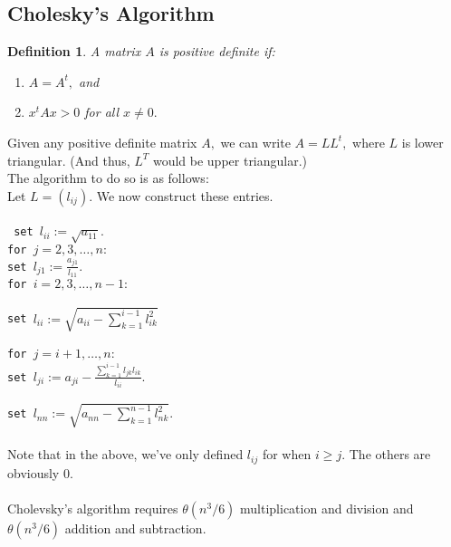 \documentclass{article}
\newtheorem{defn}{Definition}
\begin{document}
\subsection{Cholesky's Algorithm}
\begin{defn} 
	A matrix $A$ is positive definite if:
	\begin{enumerate} 
		\item $A = A^t,$ and
		\item $x^tAx > 0$ for all $x \neq 0.$
	\end{enumerate}
\end{defn}
Given any positive definite matrix $A,$ we can write $A = LL^t,$ where $L$ is lower triangular. (And thus, $L^T$ would be upper triangular.)\\
The algorithm to do so is as follows:\\
Let $L = (l_{ij}).$ We now construct these entries.\\~\\
\texttt{
	set $l_{ii} := \sqrt{a_{11}}.$\\
	for $j = 2, 3, \ldots, n:$ \\
	\phantom{123456} set $l_{j1} := \frac{a_{j1}}{l_{11}}.$\\
	for $i = 2, 3, \ldots, n - 1:$\\~\\
	\phantom{123456} set $l_{ii} := \sqrt{\displaystyle a_{ii} - \sum_{k=1}^{i-1}l_{ik}^2}$\\~\\
	\phantom{123456} for $j = i+1, \ldots, n:$ \\
	\phantom{123456}\phantom{123456}set $l_{ji} := \displaystyle a_{ji} - \frac{\displaystyle\sum_{k=1}^{i-1}l_{jk}l_{ik}}{l_{ii}}.$\\~\\
	set $l_{nn} := \sqrt{a_{nn} - \displaystyle\sum_{k=1}^{n-1}l_{nk}^2}.$
}\\~\\
Note that in the above, we've only defined $l_{ij}$ for when $i \ge j.$ The others are obviously $0.$\\~\\
Cholevsky's algorithm requires $\theta(n^3/6)$ multiplication and division and $\theta(n^3/6)$ addition and subtraction.
\end{document}
